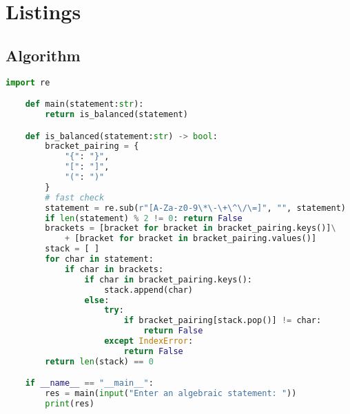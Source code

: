 \documentclass{report}
\begin{document}
\section{Listings}
\subsection{Algorithm}
\begin{lstlisting}[language=Python]
	import re

	def main(statement:str):
		return is_balanced(statement)

	def is_balanced(statement:str) -> bool:
		bracket_pairing = {
			"{": "}",
			"[": "]",
			"(": ")"
		}
		# fast check
		statement = re.sub(r"[A-Za-z0-9\*\-\+\^\/\=]", "", statement)
		if len(statement) % 2 != 0: return False
		brackets = [bracket for bracket in bracket_pairing.keys()]\
			+ [bracket for bracket in bracket_pairing.values()]
		stack = [ ]
		for char in statement:
			if char in brackets:
				if char in bracket_pairing.keys():
					stack.append(char)
				else:
					try:
						if bracket_pairing[stack.pop()] != char:
							return False
					except IndexError:
						return False
		return len(stack) == 0

	if __name__ == "__main__":
		res = main(input("Enter an algebraic statement: "))
		print(res)
\end{lstlisting}
\end{document}
